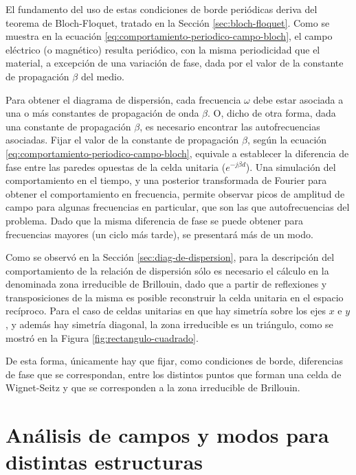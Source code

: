 El fundamento del uso de estas condiciones de borde periódicas deriva del teorema de Bloch-Floquet, tratado en la Sección \ref{sec:bloch-floquet}. Como se muestra en la ecuación \ref{eq:comportamiento-periodico-campo-bloch}, el campo eléctrico (o magnético) resulta periódico, con la misma periodicidad que el material, a excepción de una variación de fase, dada por el valor de la constante de propagación $\beta$ del medio.

Para obtener el diagrama de dispersión, cada frecuencia $\omega$ debe estar asociada a una o más constantes de propagación de onda $\beta$. O, dicho de otra forma, dada una constante de propagación $\beta$, es necesario encontrar las autofrecuencias asociadas. Fijar el valor de la constante de propagación $\beta$, según la ecuación \ref{eq:comportamiento-periodico-campo-bloch}, equivale a establecer la diferencia de fase entre las paredes opuestas de la celda unitaria ($e^{-j\beta d}$). Una simulación del comportamiento en el tiempo, y una posterior transformada de Fourier para obtener el comportamiento en frecuencia, permite observar picos de amplitud de campo para algunas frecuencias en particular, que son las que autofrecuencias del problema. Dado que la misma diferencia de fase se puede obtener para frecuencias mayores (un ciclo más tarde), se presentará más de un modo.

Como se observó en la Sección \ref{sec:diag-de-dispersion}, para la descripción del comportamiento de la relación de dispersión sólo es necesario el cálculo en la denominada zona irreducible de Brillouin, dado que a partir de reflexiones y transposiciones de la misma es posible reconstruir la celda unitaria en el espacio recíproco. Para el caso de celdas unitarias en que hay simetría sobre los ejes $x$ e $y$, y además hay simetría diagonal, la zona irreducible es un triángulo, como se mostró en la Figura \ref{fig:rectangulo-cuadrado}.

De esta forma, únicamente hay que fijar, como condiciones de borde, diferencias de fase que se correspondan, entre los distintos puntos que forman una celda de Wignet-Seitz y que se corresponden a la zona irreducible de Brillouin.



\section{Análisis de campos y modos para distintas estructuras}
\label{sec_estructuras_propuestas}

